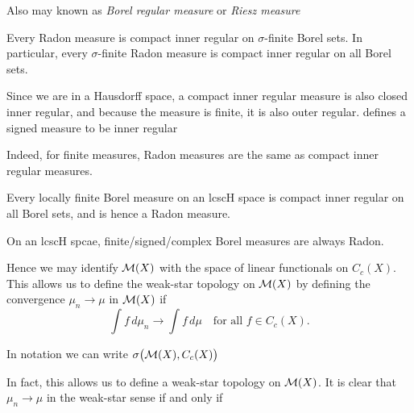 Also may known as \emph{Borel regular measure} or \emph{Riesz measure}

\begin{prop}
    Every Radon measure is compact inner regular on $\sigma$-finite Borel sets. In particular, every $\sigma$-finite Radon measure is compact inner regular on all Borel sets.
\end{prop}

Since we are in a Hausdorff space, a compact inner regular measure is also closed inner regular, and because the measure is finite, it is also outer regular. \textcite{Bogachev_2007,Bogachev_2018} defines a signed measure to be inner regular

Indeed, for finite measures, Radon measures are the same as compact inner regular measures.

\begin{prop}
    Every locally finite Borel measure on an lcscH space is compact inner regular on all Borel sets, and is hence a Radon measure.
\end{prop}

On an lcscH spcae, finite/signed/complex Borel measures are always Radon.

Hence we may identify $\mathcal{M}(X)$ with the space of linear functionals on $C_c(X)$. This allows us to define the weak-star topology on $\mathcal{M}(X)$ by defining the convergence $\mu_n \to \mu$ in $\mathcal{M}(X)$ if \[
    \int f\,d\mu_n \to \int f\,d\mu \quad \text{for all }f \in C_c(X).
\] 

In notation we can write $\sigma\bigl(\mathcal{M}(X), C_c(X) \bigr)$

In fact, this allows us to define a weak-star topology on $\mathcal{M}(X)$. It is clear that $\mu_n \to \mu$ in the weak-star sense if and only if 


\begin{namedthm} \label{thm:Riesz1}
    
\end{namedthm}


